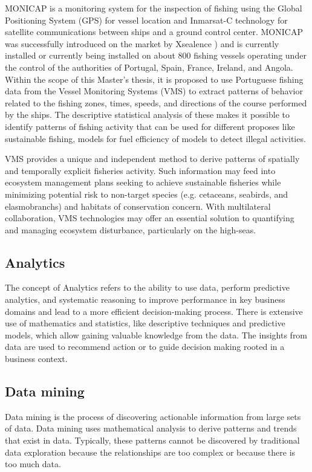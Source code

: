 MONICAP \cite{WEBSITE:MonicapXsealence} is a monitoring system for the inspection of fishing using the Global Positioning System (GPS) for vessel location and Inmarsat-C \cite{WEBSITE:inmarsatC} technology for satellite communications between ships and a ground control center. MONICAP was successfully introduced on the market by Xsealence \cite{WEBSITE:Xsealence}) and is currently installed or currently being installed on about 800 fishing vessels operating under the control of the authorities of Portugal, Spain, France, Ireland, and Angola. Within the scope of this Master's thesis, it is proposed to use Portuguese fishing data from the Vessel Monitoring Systems (VMS) to extract patterns of behavior related to the fishing zones, times, speeds, and directions of the course performed by the ships. The descriptive statistical analysis of these makes it possible to identify patterns of fishing activity that can be used for different proposes like sustainable fishing, models for fuel efficiency of models to detect illegal activities.

VMS provides a unique and independent method to derive patterns of spatially and temporally explicit fisheries activity. Such information may feed into ecosystem management plans seeking to achieve sustainable fisheries while minimizing potential risk to non-target species (e.g. cetaceans, seabirds, and elasmobranchs) and habitats of conservation concern. With multilateral collaboration, VMS technologies may offer an essential solution to quantifying and managing ecosystem disturbance, particularly on the high-seas.




\subsection{Analytics} %
\label{sub:analytucs}
The concept of Analytics refers to the ability to use data, perform predictive analytics, and systematic reasoning to improve performance in key business domains and lead to a more efficient decision-making process.
There is extensive use of mathematics and statistics, like descriptive techniques and predictive models, which allow gaining valuable knowledge from the data.
The insights from data are used to recommend action or to guide decision making rooted in a business context.



\subsection{Data mining} %
\label{sub:data_mining}
Data mining is the process of discovering actionable information from large sets of data. Data mining uses mathematical analysis to derive patterns and trends that exist in data. Typically, these patterns cannot be discovered by traditional data exploration because the relationships are too complex or because there is too much data.


